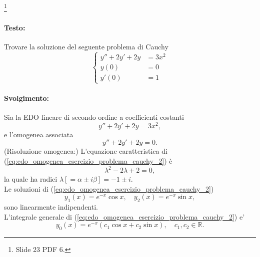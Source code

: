 \begin{example}\footnote{Slide 23 PDF 6.}
	\paragraph{Testo:} Trovare la soluzione del seguente problema di Cauchy
	\begin{equation*}
		\begin{cases}
			y'' + 2y' + 2y &= 3x^2\\
			y(0) &= 0\\
			y'(0)&=1 
		\end{cases}
	\end{equation*}
	\paragraph{Svolgimento:} Sia la EDO lineare di secondo ordine a coefficienti costanti
	\begin{equation}\label{eq:edo_completa_esercizio_problema_cauchy_2}
		y'' + 2y' + 2y = 3x^2,
	\end{equation}
	e l'omogenea associata
	\begin{equation}\label{eq:edo_omogenea_esercizio_problema_cauchy_2}
		y'' + 2y' + 2y = 0.
	\end{equation}
	(Risoluzione omogenea:) L'equazione caratteristica di (\ref{eq:edo_omogenea_esercizio_problema_cauchy_2}) è
	\begin{equation*}
		\lambda^2 - 2\lambda + 2 = 0,
	\end{equation*}
	la quale ha radici $\lambda[= \alpha \pm i\beta] = -1 \pm i$.\\
	Le soluzioni di (\ref{eq:edo_omogenea_esercizio_problema_cauchy_2})
	\begin{equation*}
		y_1(x) = e^{-x}\cos x,\quad y_2(x) = e^{-x}\sin x,
	\end{equation*}
	sono linearmente indipendenti.\\
	L'integrale generale di (\ref{eq:edo_omogenea_esercizio_problema_cauchy_2}) e'
	\begin{equation*}
		y_0(x)=e^{-x}(c_1\cos x + c_2\sin x),\quad c_1,c_2\in\mathbb{R}.
	\end{equation*}

\end{example}
